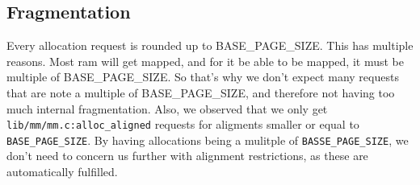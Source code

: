 % 
% 
% 
% 
% 

\subsection{Fragmentation}

Every allocation request is rounded up to BASE\_PAGE\_SIZE.
This has multiple reasons.
Most ram will get mapped, and for it be able to be mapped, it must be multiple
of BASE\_PAGE\_SIZE.
So that's why we don't expect many requests that are note a multiple of
BASE\_PAGE\_SIZE, and therefore not having too much internal fragmentation.
Also, we observed that we only get \verb|lib/mm/mm.c:alloc_aligned| requests for
aligments smaller or equal to \verb|BASE_PAGE_SIZE|.
By having allocations being a mulitple of \verb|BASSE_PAGE_SIZE|, we don't
need to concern us further with alignment restrictions, as these are
automatically fulfilled.


